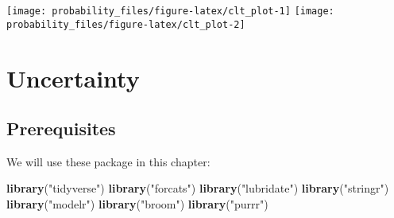 \documentclass[]{book}
\newenvironment{Shaded}{\begin{snugshade}}{\end{snugshade}}
\newcommand{\KeywordTok}[1]{\textcolor[rgb]{0.13,0.29,0.53}{\textbf{#1}}}
\newcommand{\DataTypeTok}[1]{\textcolor[rgb]{0.13,0.29,0.53}{#1}}
\newcommand{\DecValTok}[1]{\textcolor[rgb]{0.00,0.00,0.81}{#1}}
\newcommand{\StringTok}[1]{\textcolor[rgb]{0.31,0.60,0.02}{#1}}
\newcommand{\ControlFlowTok}[1]{\textcolor[rgb]{0.13,0.29,0.53}{\textbf{#1}}}
\newcommand{\OperatorTok}[1]{\textcolor[rgb]{0.81,0.36,0.00}{\textbf{#1}}}
\newcommand{\NormalTok}[1]{#1}
\theoremstyle{definition}
\theoremstyle{definition}
\theoremstyle{definition}
\theoremstyle{remark}
\begin{document}
\begin{Shaded}
\end{Shaded}

\begin{center}\texttt{[image: probability\_files/figure-latex/clt\_plot-1]} \texttt{[image: probability\_files/figure-latex/clt\_plot-2]} \end{center}

\chapter{Uncertainty}\label{uncertainty}

\section*{Prerequisites}\label{prerequisites-8}

We will use these package in this chapter:

\begin{Shaded}
\begin{Highlighting}[]
\KeywordTok{library}\NormalTok{(}\StringTok{"tidyverse"}\NormalTok{)}
\KeywordTok{library}\NormalTok{(}\StringTok{"forcats"}\NormalTok{)}
\KeywordTok{library}\NormalTok{(}\StringTok{"lubridate"}\NormalTok{)}
\KeywordTok{library}\NormalTok{(}\StringTok{"stringr"}\NormalTok{)}
\KeywordTok{library}\NormalTok{(}\StringTok{"modelr"}\NormalTok{)}
\KeywordTok{library}\NormalTok{(}\StringTok{"broom"}\NormalTok{)}
\KeywordTok{library}\NormalTok{(}\StringTok{"purrr"}\NormalTok{)}
\end{Highlighting}
\end{Shaded}
\end{document}
